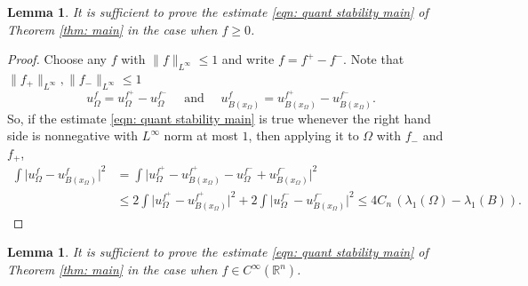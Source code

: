 \documentclass[10pt,a4paper]{amsart}
\numberwithin{equation}{section}
\newtheorem{lemma}[theorem]{Lemma}
\def\R{{\mathbb R}}
\def\W{\Omega}
\begin{document}
 \begin{lemma} \label{l:fnonneg}
   It is sufficient to prove the estimate \eqref{eqn: quant stability main} of  Theorem \ref{thm: main} in the case when  $f \geq 0$. 
 \end{lemma}

 \begin{proof}
 Choose any $f$ with $\| f\|_{L^{\infty}} \leq 1$ and  write $f = f^+ - f^-$. Note that $\| f_+\|_{L^{\infty}}, \| f_-\|_{L^{\infty}} \leq 1$
   \[
   u_{\W}^f = u_{\W}^{f^+} - u_{\W}^{f^-} \quad \text{ and } \quad 
   u_{B(x_{\W})}^f = u_{B(x_{\W})}^{f^+} - u_{B(x_{\W})}^{f^-}. 
   \]
   So, if the estimate \eqref{eqn: quant stability main}  is true whenever the right hand side is nonnegative with $L^{\infty}$ norm at most $1$, then applying it to $\W$ with $f_-$ and $f_+$,
   \[
   \begin{aligned}
   \int \big|u_{\W}^f- u_{B(x_{\W})}^f \big|^2
   &= \int \big|u_{\W}^{f^+} - u_{B(x_{\W})}^{f^+} -u_{\W}^{f^-} + u_{B(x_{\W})}^{f^-}  \big|^2\\
   &\leq 2\int \big|u_{\W}^{f^+} - u_{B(x_{\W})}^{f^+} \big|^2
   + 2\int \big|u_{\W}^{f^-} - u_{B(x_{\W})}^{f^-} \big|^2\leq 4 C_{n}\, (\lambda_1(\W) - \lambda_1(B)). 
   \end{aligned}
   \]
 \end{proof}

\begin{lemma} \label{l:fsmooth}
 It is sufficient to prove  the estimate \eqref{eqn: quant stability main} of  Theorem \ref{thm: main} in the case when  $f \in C^{\infty}(\R^n)$. 
\end{lemma}
\end{document}
